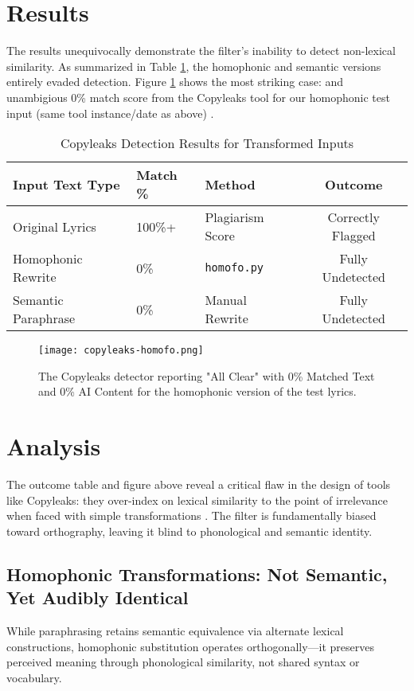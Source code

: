 \documentclass[12pt]{article}
\begin{document}
\section{Results}
The results unequivocally demonstrate the filter's inability to detect non-lexical similarity. As summarized in Table \ref{tab:results}, the homophonic and semantic versions entirely evaded detection.  Figure \ref{fig:copyleaks} shows the most striking case: and unambigious 0\% match score from the Copyleaks tool for our homophonic test input (same tool instance/date as above) \cite{copyleaks-claim}.


\begin{table}[H]
\centering
\caption{Copyleaks Detection Results for Transformed Inputs}
\label{tab:results}
\begin{tabular}{@{}lllc@{}}
\toprule
\textbf{Input Text Type} & \textbf{Match \%} & \textbf{Method} & \textbf{Outcome} \\
\midrule
Original Lyrics     & 100\%+             & Plagiarism Score            & Correctly Flagged \\
Homophonic Rewrite  & 0\%               & \texttt{homofo.py} & Fully Undetected \\
Semantic Paraphrase & 0\%               & Manual Rewrite  & Fully Undetected \\
\bottomrule
\end{tabular}
\end{table}

\begin{figure}[H]
    \centering
    \texttt{[image: copyleaks-homofo.png]}
    \caption{The Copyleaks detector reporting "All Clear" with 0\% Matched Text and 0\% AI Content for the homophonic version of the test lyrics.}
    \label{fig:copyleaks}
\end{figure}

\section{Analysis}
The outcome table and figure above reveal a critical flaw in the design of tools like Copyleaks: they over-index on lexical similarity to the point of irrelevance when faced with simple transformations \cite{pan2014-overview,weber-wulff-2023}. The filter is fundamentally biased toward orthography, leaving it blind to phonological and semantic identity\cite{barron-cedeno-2013}.


\subsection{Homophonic Transformations: Not Semantic, Yet Audibly Identical}
While paraphrasing retains semantic equivalence via alternate lexical constructions, homophonic substitution operates orthogonally—it preserves perceived meaning through phonological similarity, not shared syntax or vocabulary.
\end{document}

